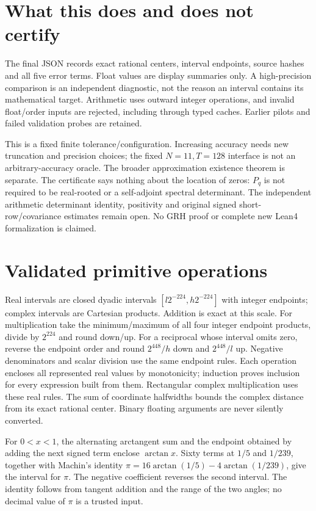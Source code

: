 \documentclass[11pt]{article}
\theoremstyle{definition}\newtheorem{definition}[theorem]{Definition}
\theoremstyle{remark}\newtheorem{remark}[theorem]{Remark}
\begin{document}
\section{What this does and does not certify}
The final JSON records exact rational centers, interval endpoints, source
hashes and all five error terms. Float values are display summaries only.
A high-precision comparison is an independent diagnostic, not the reason
an interval contains its mathematical target. Arithmetic uses outward
integer operations, and invalid float/order inputs are rejected, including
through typed caches. Earlier pilots and failed validation probes are retained.

This is a fixed finite tolerance/configuration. Increasing accuracy needs
new truncation and precision choices; the fixed $N=11,T=128$ interface is
not an arbitrary-accuracy oracle. The broader approximation existence theorem
is separate. The certificate says nothing about the location of zeros:
$P_q$ is not required to be real-rooted or a self-adjoint spectral determinant.
The independent arithmetic determinant identity, positivity and original
signed short-row/covariance estimates remain open. No GRH proof or complete
new Lean4 formalization is claimed.

\section{Validated primitive operations}
Real intervals are closed dyadic intervals $[l2^{-224},h2^{-224}]$ with
integer endpoints; complex intervals are Cartesian products. Addition is
exact at this scale. For multiplication take the minimum/maximum of all four
integer endpoint products, divide by $2^{224}$ and round down/up. For a
reciprocal whose interval omits zero, reverse the endpoint order and round
$2^{448}/h$ down and $2^{448}/l$ up. Negative denominators and scalar division
use the same endpoint rules. Each operation encloses all represented real
values by monotonicity; induction proves inclusion for every expression
built from them. Rectangular complex multiplication uses these real rules.
The sum of coordinate halfwidths bounds the complex distance from its exact
rational center. Binary floating arguments are never silently converted.

For $0<x<1$, the alternating arctangent sum and the endpoint obtained by
adding the next signed term enclose $\arctan x$. Sixty terms at $1/5$ and
$1/239$, together with Machin's identity
$\pi=16\arctan(1/5)-4\arctan(1/239)$, give the interval for $\pi$.
The negative coefficient reverses the second interval. The identity follows
from tangent addition and the range of the two angles; no decimal value of
$\pi$ is a trusted input.
\end{document}
